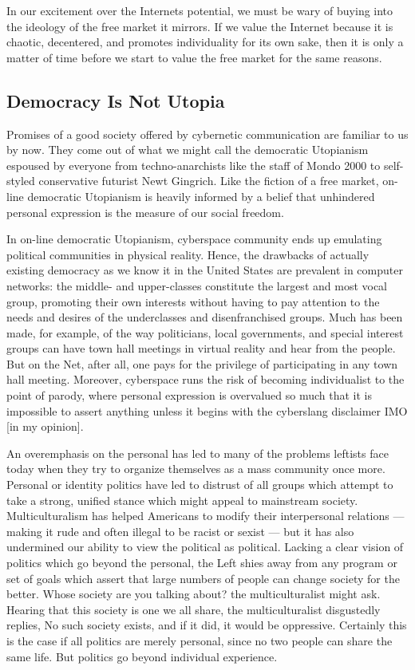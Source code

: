 \documentclass[letterpaper,12pt,english]{sphinxmanual}
\begin{document}
In our excitement over the Internets potential, we must be wary of buying into the ideology of the free market it mirrors. If we value the Internet because it is chaotic, decentered, and promotes individuality for its own sake, then it is only a matter of time before we start to value the free market for the same reasons.


\subsection{Democracy Is Not Utopia}
\label{1995:democracy-is-not-utopia}
Promises of a good society offered by cybernetic communication are familiar to us by now. They come out of what we might call the democratic Utopianism espoused by everyone from techno-anarchists like the staff of Mondo 2000 to self-styled conservative futurist Newt Gingrich. Like the fiction of a free market, on-line democratic Utopianism is heavily informed by a belief that unhindered personal expression is the measure of our social freedom.

In on-line democratic Utopianism, cyberspace community ends up emulating political communities in physical reality. Hence, the drawbacks of actually existing democracy as we know it in the United States are prevalent in computer networks: the middle- and upper-classes constitute the largest and most vocal group, promoting their own interests without having to pay attention to the needs and desires of the underclasses and disenfranchised groups. Much has been made, for example, of the way politicians, local governments, and special interest groups can have town hall meetings in virtual reality and hear from the people. But on the Net, after all, one pays for the privilege of participating in any town hall meeting. Moreover, cyberspace runs the risk of becoming individualist to the point of parody, where personal expression is overvalued so much that it is impossible to assert anything unless it begins with the cyberslang disclaimer IMO {[}in my opinion{]}.

An overemphasis on the personal has led to many of the problems leftists face today when they try to organize themselves as a mass community once more. Personal or identity politics have led to distrust of all groups which attempt to take a strong, unified stance which might appeal to mainstream society. Multiculturalism has helped Americans to modify their interpersonal relations — making it rude and often illegal to be racist or sexist — but it has also undermined our ability to view the political as political. Lacking a clear vision of politics which go beyond the personal, the Left shies away from any program or set of goals which assert that large numbers of people can change society for the better. Whose society are you talking about? the multiculturalist might ask. Hearing that this society is one we all share, the multiculturalist disgustedly replies, No such society exists, and if it did, it would be oppressive. Certainly this is the case if all politics are merely personal, since no two people can share the same life. But politics go beyond individual experience.
\end{document}
